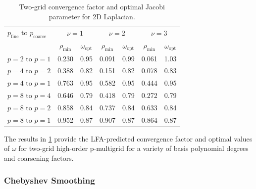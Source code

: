 \documentclass[review]{siamart190516}
\begin{document}
\begin{table}[ht!]
\begin{center}
\begin{tabular}{l cc cc cc}
  \toprule
  $p_{\text{fine}}$ to $p_{\text{coarse}}$  &  \multicolumn{2}{c}{$\nu = 1$}  &  \multicolumn{2}{c}{$\nu = 2$}  &  \multicolumn{2}{c}{$\nu = 3$}  \\
                      &  $\rho_{\min}$  &  $\omega_{\text{opt}}$  &  $\rho_{\min}$ & $\omega_{\text{opt}}$  &  $\rho_{\min}$ & $\omega_{\text{opt}}$  \\
  \toprule
  $p = 2$ to $p = 1$  &  0.230 & 0.95  &  0.091 & 0.99  &  0.061 & 1.03   \\
  \midrule
  $p = 4$ to $p = 2$  &  0.388 & 0.82  &  0.151 & 0.82  &  0.078 & 0.83   \\
  $p = 4$ to $p = 1$  &  0.763 & 0.95  &  0.582 & 0.95  &  0.444 & 0.95   \\
  \midrule
  $p = 8$ to $p = 4$  &  0.646 & 0.79  &  0.418 & 0.79  &  0.272 & 0.79   \\
  $p = 8$ to $p = 2$  &  0.858 & 0.84  &  0.737 & 0.84  &  0.633 & 0.84   \\
  $p = 8$ to $p = 1$  &  0.952 & 0.87  &  0.907 & 0.87  &  0.864 & 0.87   \\
  \bottomrule
\end{tabular}
\end{center}
\caption{Two-grid convergence factor and optimal Jacobi parameter for 2D Laplacian.}
\label{table:two_grid_2d}
\end{table}

The results in \cref{table:two_grid_2d} provide the LFA-predicted convergence factor and optimal values of $\omega$ for two-grid high-order p-multigrid for a variety of basis polynomial degrees and coarsening factors.

\subsubsection{Chebyshev Smoothing}
\end{document}
